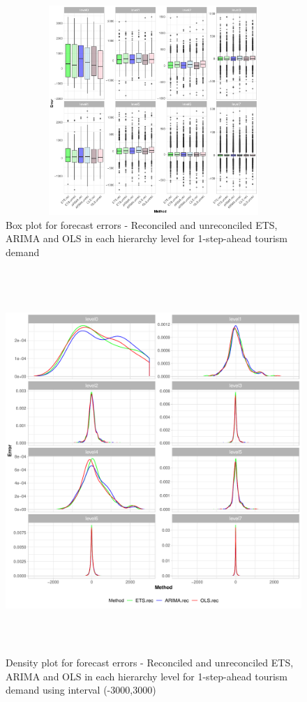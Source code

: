 \documentclass[11pt,a4paper,]{article}
\begin{document}
\begin{figure}

{\centering \includegraphics[width=450px,height=300px]{Paper-Figures/results_Tourism/boxplot_1} 

}

\caption{Box plot for forecast errors - Reconciled and unreconciled ETS, ARIMA and OLS in each hierarchy level for 1-step-ahead tourism demand}\label{fig:boxplotrollingtourism}
\end{figure}

\begin{figure}

{\centering \includegraphics[width=450px,height=550px]{Paper-Figures/results_Tourism/densityplot_1} 

}

\caption{Density plot for forecast errors - Reconciled and unreconciled ETS, ARIMA and OLS in each hierarchy level for 1-step-ahead tourism demand using interval (-3000,3000)}\label{fig:densityplotrollingtourism}
\end{figure}
\end{document}
